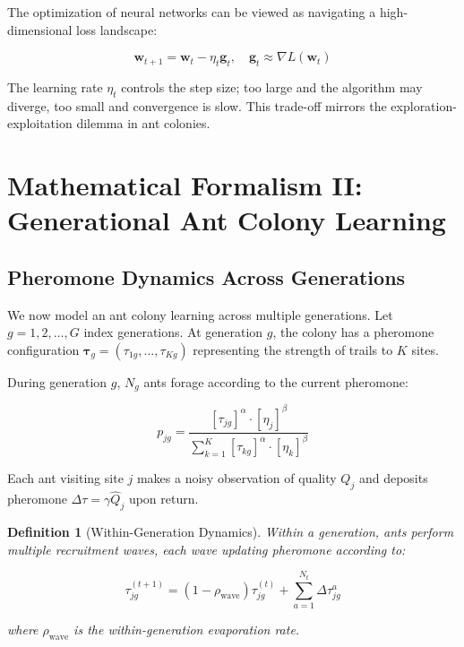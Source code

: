 \documentclass[12pt,letterpaper]{article}
\newtheorem{definition}[theorem]{Definition}
\begin{document}
The optimization of neural networks can be viewed as navigating a high-dimensional loss landscape:

\begin{equation}
\mathbf{w}_{t+1} = \mathbf{w}_t - \eta_t \mathbf{g}_t, \quad \mathbf{g}_t \approx \nabla L(\mathbf{w}_t) \label{eq:landscape}
\end{equation}

The learning rate $\eta_t$ controls the step size; too large and the algorithm may diverge, too small and convergence is slow. This trade-off mirrors the exploration-exploitation dilemma in ant colonies.

\section{Mathematical Formalism II: Generational Ant Colony Learning}

\subsection{Pheromone Dynamics Across Generations}

We now model an ant colony learning across multiple generations. Let $g = 1,2,\ldots,G$ index generations. At generation $g$, the colony has a pheromone configuration $\boldsymbol{\tau}_g = (\tau_{1g},\ldots,\tau_{Kg})$ representing the strength of trails to $K$ sites.

During generation $g$, $N_g$ ants forage according to the current pheromone:

\begin{equation}
p_{jg} = \frac{[\tau_{jg}]^\alpha \cdot [\eta_j]^\beta}{\sum_{k=1}^K [\tau_{kg}]^\alpha \cdot [\eta_k]^\beta} \label{eq:ant_choice}
\end{equation}

Each ant visiting site $j$ makes a noisy observation of quality $Q_j$ and deposits pheromone $\Delta \tau = \gamma \hat{Q}_j$ upon return.

\begin{definition}[Within-Generation Dynamics]
Within a generation, ants perform multiple recruitment waves, each wave updating pheromone according to:

\begin{equation}
\tau_{jg}^{(t+1)} = (1-\rho_{\text{wave}})\tau_{jg}^{(t)} + \sum_{a=1}^{N_t} \Delta \tau_{jg}^a \label{eq:within_gen}
\end{equation}

where $\rho_{\text{wave}}$ is the within-generation evaporation rate.
\end{definition}
\end{document}
